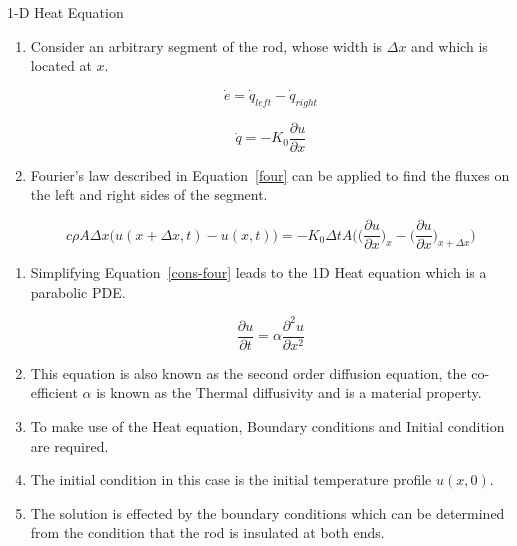 \documentclass[10pt,compress]{beamer}
\begin{document}
\begin{frame}{1-D Heat Equation}
\begin{enumerate}
\item Consider an arbitrary segment of the rod, whose width is $\Delta x$ and which is located at $x$.
\begin{center}
\begin{equation} \label{econserve}
	\dot{e}= \dot{q}_{left} - \dot{q}_{right}
\end{equation}
\end{center}
\begin{center}
\begin{equation} \label{four}
\dot{q} = -K_{0} \frac{\partial u}{\partial x}
\end{equation}
\end{center}
\item Fourier's law described in Equation~\ref{four} can be applied to find the fluxes on the left and right sides of the segment.
\begin{center}
\begin{equation} \label{cons-four}
c \rho A \Delta x \bigg(u(x+ \Delta x,t)-u(x,t) \bigg) = -K_{0} \Delta t A \bigg(  \Big( \frac{\partial u}{\partial x} \Big)_{x}-\Big( \frac{\partial u}{\partial x}\Big)_{x+ \Delta x} \bigg )
\end{equation}
\end{center}
\end{enumerate}
\end{frame}

\begin{frame}
\begin{enumerate}
\item Simplifying Equation~\ref{cons-four} leads to the 1D Heat equation which is a parabolic PDE.
\begin{center}
\begin{equation} \label{1diff}
\frac{\partial u}{\partial t}=\alpha \frac{\partial^{2} u}{\partial x^{2}}
\end{equation}
\end{center}
\item This equation is also known as the second order diffusion equation, the co-efficient $\alpha$ is known as the Thermal diffusivity and is a material property.
\item To make use of the Heat equation, Boundary conditions and Initial condition are required.
\item The initial condition in this case is the initial temperature profile $u(x,0)$.
\item The solution is effected by the boundary conditions which can be determined from the condition that the rod is insulated at both ends.
\end{enumerate}
\end{frame}
\end{document}
